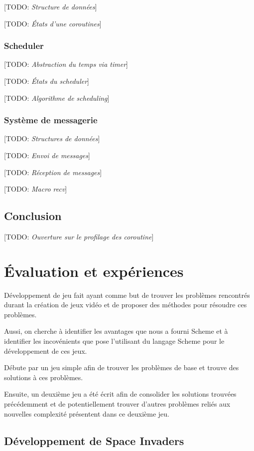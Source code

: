 \documentclass[12pt,oneside,letterpaper,francais]{book}
\newcommand{\todo}[1]{[TODO: {\it #1}]}
\begin{document}
\todo{Structure de données}

\todo{États d'une coroutines}

\subsection{Scheduler}
\todo{Abstraction du temps via timer}

\todo{États du scheduler}

\todo{Algorithme de scheduling}

\subsection{Système de messagerie}
\todo{Structures de données}

\todo{Envoi de messages}

\todo{Réception de messages}

\todo{Macro recv}


\section{Conclusion}
\todo{Ouverture sur le profilage des coroutine}


\chapter{Évaluation et expériences}

Développement de jeu fait ayant comme but de trouver les problèmes
rencontrés durant la création de jeux vidéo et de proposer des
méthodes pour résoudre ces problèmes.

Aussi, on cherche à identifier les avantages que nous a fourni Scheme
et à identifier les incovénients que pose l'utilisant du langage
Scheme pour le développement de ces jeux.

Débute par un jeu simple afin de trouver les problèmes de base et
trouve des solutions à ces problèmes.

Ensuite, un deuxième jeu a été écrit afin de consolider les solutions
trouvées précédemment et de potentiellement trouver d'autres problèmes
reliés aux nouvelles complexité présentent dans ce deuxième jeu.

\section{Développement de \og Space Invaders \fg}
\end{document}
